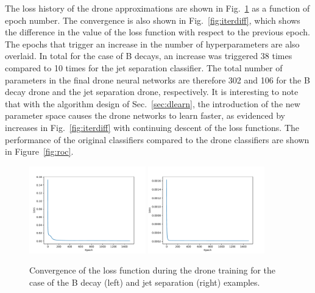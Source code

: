 \documentclass[final,5p,times,twocolumn]{elsarticle}
\begin{document}
The loss history of the drone approximations are shown in Fig.~\ref{fig:loss}
as a function of epoch number.
The convergence is also shown in Fig.~\ref{fig:iterdiff}, which shows
the difference in the value of the loss function with respect to the previous
epoch. The epochs that trigger an increase in the number of hyperparameters
are also overlaid.
In total for the case of B decays, an increase was triggered 38 times compared to 10 times for the
jet separation classifier. The total number
of parameters in the final drone neural networks are therefore 302 and 106 for the B decay drone
and the jet separation drone, respectively. It is interesting
to note that with the algorithm design of Sec.~\ref{sec:dlearn}, the introduction
of the new parameter space causes the drone networks to learn faster, as evidenced by
increases in Fig.~\ref{fig:iterdiff} with continuing descent of the loss functions.
%
The performance of the original classifiers compared to the drone classifiers are shown in Figure~\ref{fig:roc}.
\begin{figure}[t]
\centering
\includegraphics[width=0.45\textwidth]{loss_history}
\includegraphics[width=0.45\textwidth]{loss_history_gpd}
\caption{\small
Convergence of the loss function during the drone training
  for the case of the B
  decay (left) and jet separation (right) examples.
}
\label{fig:loss}
\end{figure}
\end{document}
